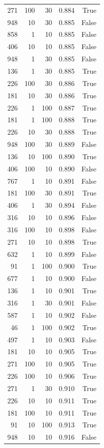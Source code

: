\begin{tabular}{rrrrr}
271 & 100 & 30 & 0.884 & True \\
948 & 10 & 30 & 0.885 & False \\
858 & 1 & 10 & 0.885 & False \\
406 & 10 & 10 & 0.885 & False \\
948 & 1 & 30 & 0.885 & False \\
136 & 1 & 30 & 0.885 & True \\
226 & 100 & 30 & 0.886 & True \\
181 & 10 & 30 & 0.886 & True \\
226 & 1 & 100 & 0.887 & True \\
181 & 1 & 100 & 0.888 & True \\
226 & 10 & 30 & 0.888 & True \\
948 & 100 & 30 & 0.889 & False \\
136 & 10 & 100 & 0.890 & True \\
406 & 100 & 10 & 0.890 & False \\
767 & 1 & 10 & 0.891 & False \\
181 & 100 & 30 & 0.891 & True \\
406 & 1 & 30 & 0.894 & False \\
316 & 10 & 10 & 0.896 & False \\
316 & 100 & 10 & 0.898 & False \\
271 & 10 & 10 & 0.898 & True \\
632 & 1 & 10 & 0.899 & False \\
91 & 1 & 100 & 0.900 & True \\
677 & 1 & 10 & 0.900 & False \\
136 & 1 & 10 & 0.901 & True \\
316 & 1 & 30 & 0.901 & False \\
587 & 1 & 10 & 0.902 & False \\
46 & 1 & 100 & 0.902 & True \\
497 & 1 & 10 & 0.903 & False \\
181 & 10 & 10 & 0.905 & True \\
271 & 100 & 10 & 0.905 & True \\
226 & 100 & 10 & 0.906 & True \\
271 & 1 & 30 & 0.910 & True \\
226 & 10 & 10 & 0.911 & True \\
181 & 100 & 10 & 0.911 & True \\
91 & 10 & 100 & 0.913 & True \\
948 & 10 & 10 & 0.916 & False \\

\end{tabular}
